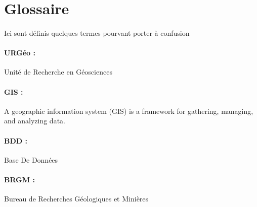 \section{Glossaire}
\paragraph{}Ici sont définis quelques termes pourvant porter à confusion
\paragraph{URGéo :}
Unité de Recherche en Géosciences

\paragraph{GIS :}  
A geographic information system (GIS) is a framework for gathering, managing, and analyzing data.

\paragraph{BDD :} 
Base De Données

\paragraph{BRGM :}
Bureau de Recherches Géologiques et Minières